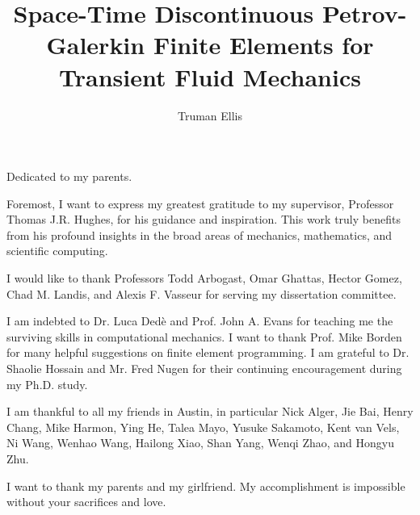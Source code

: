 \documentclass[12pt]{report} %
\author{Truman Ellis}  	%
\title{Space-Time Discontinuous Petrov-Galerkin Finite Elements for Transient Fluid Mechanics}
\begin{document}
\copyrightpage          %


%
%
%
\commcertpage           %

\titlepage  %



%
\begin{dedication}
%
Dedicated to my parents.
\end{dedication}


\begin{acknowledgments}		%
%
Foremost, I want to express my greatest gratitude to my supervisor, Professor Thomas J.R. Hughes, for his guidance and inspiration. This work truly benefits from his profound insights in the broad areas of mechanics, mathematics, and scientific computing.

I would like to thank Professors Todd Arbogast, Omar Ghattas, Hector Gomez, Chad M. Landis, and Alexis F. Vasseur for serving my dissertation committee.

I am indebted to Dr. Luca Ded\`e and Prof. John A. Evans for teaching me the surviving skills in computational mechanics. I want to thank Prof. Mike Borden for many helpful suggestions on finite element programming. I am grateful to Dr. Shaolie Hossain and Mr. Fred Nugen for their continuing encouragement during my Ph.D. study.

I am thankful to all my friends in Austin, in particular Nick Alger, Jie Bai, Henry Chang, Mike Harmon, Ying He, Talea Mayo, Yusuke Sakamoto, Kent van Vels, Ni Wang, Wenhao Wang, Hailong Xiao, Shan Yang, Wenqi Zhao, and Hongyu Zhu.

I want to thank my parents and my girlfriend. My accomplishment is impossible without your sacrifices and love.

\end{acknowledgments}
\end{document}
